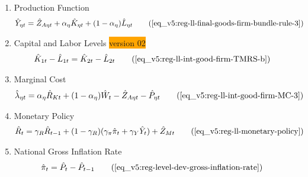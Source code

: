 \documentclass[../thesis.tex]{subfiles}
\begin{document}
{\begin{itemize}
\begin{enumerate}
		\item Production Function
		\begin{align}
			\hat{Y}_{\eta t} &= \hat{Z}_{A\eta t} + {\alpha_{\eta}} \hat{K}_{\eta t} + (1-\alpha_{\eta}) \hat{L}_{\eta t} \tag{\ref{eq_v5:reg-ll-final-goods-firm-bundle-rule-3}}
		\end{align}

		\item Capital and Labor Levels \colorbox{orange}{version 02}
		\begin{align}
			\hat{K}_{1t} - \hat{L}_{1t} &= \hat{K}_{2t} - \hat{L}_{2t} \tag{\ref{eq_v5:reg-ll-int-good-firm-TMRS-b}}
		\end{align}		
		
		
		\begin{comment}

		\item Marginal Rates of Substitution of Factors
		\begin{align}
			\hat{K}_{\eta t} - \hat{L}_{\eta t} &= \hat{W}_{t} - \hat{R}_{K t} \tag{\ref{eq_v5:reg-ll-int-good-firm-TMRS}}
		\end{align}
			
		\end{comment}
		
		
		\item Marginal Cost
		\begin{alignat}{2}
			\hat{\lambda}_{\eta t} &= {\alpha_{\eta}} \hat{R}_{Kt} + (1- {\alpha_{\eta}}) \hat{W}_{t} - \hat{Z}_{A\eta t} - \hat{P}_{\eta t} \tag{\ref{eq_v5:reg-ll-int-good-firm-MC-3}}
		\end{alignat}
		
		\item Monetary Policy
		\begin{align}
			& \hat{R}_t = \gamma_R \hat{R}_{t-1} + (1-\gamma_R)(\gamma_\pi \hat{\pi}_t + \gamma_Y \hat{Y}_t) + \hat{Z}_{Mt} \tag{\ref{eq_v5:reg-ll-monetary-policy}}
		\end{align}
		
		\item National Gross Inflation Rate
		\begin{align}
			\hat{\pi}_{t} &= \hat{P}_{t} - \hat{P}_{t-1} \tag{\ref{eq_v5:reg-level-dev-gross-inflation-rate}}
		\end{align}
		

\end{enumerate}
\end{itemize}}
\end{document}
